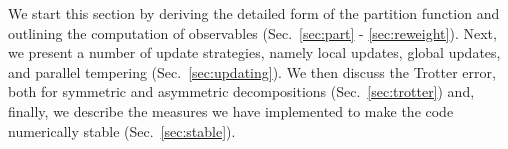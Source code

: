 



We start this section by deriving the detailed form of the partition function and outlining the computation of observables (Sec.~\ref{sec:part} - \ref{sec:reweight}). 
Next, we present a number of update strategies, namely local updates, global updates, and parallel tempering (Sec.~\ref{sec:updating}). 
We then discuss the Trotter error, both for symmetric and asymmetric decompositions (Sec.~\ref{sec:trotter}) and, finally, we describe the measures we have implemented to make the code numerically stable (Sec.~\ref{sec:stable}).

